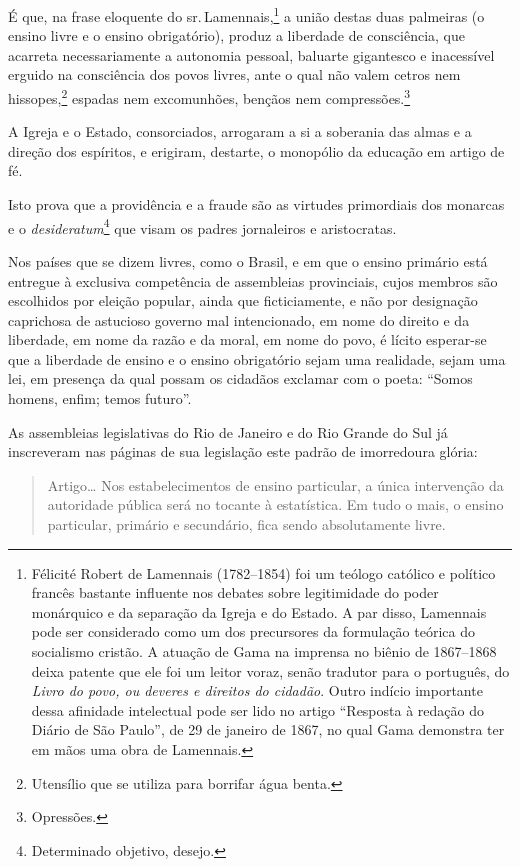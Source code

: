 É que, na frase eloquente do sr.\,Lamennais,\footnote{Félicité Robert de
  Lamennais (1782--1854) foi um teólogo católico e político francês
  bastante influente nos debates sobre legitimidade do poder monárquico
  e da separação da Igreja e do Estado. A par disso, Lamennais pode ser
  considerado como um dos precursores da formulação teórica do
  socialismo cristão. A atuação de Gama na imprensa no biênio de
  1867--1868 deixa patente que ele foi um leitor voraz, senão tradutor
  para o português, do \emph{Livro do povo, ou deveres e direitos do
  cidadão}. Outro indício importante dessa afinidade intelectual pode
  ser lido no artigo ``Resposta à redação do Diário de São Paulo'', de
  29 de janeiro de 1867, no qual Gama demonstra ter em mãos uma obra de Lamennais.}
a união destas duas palmeiras (o ensino livre e o ensino obrigatório),
produz a liberdade de consciência, que acarreta necessariamente a
autonomia pessoal, baluarte gigantesco e inacessível erguido na
consciência dos povos livres, ante o qual não valem cetros nem
hissopes,\footnote{Utensílio que se utiliza para borrifar água benta.}
espadas nem excomunhões, bençãos nem compressões.\footnote{Opressões.}

A Igreja e o Estado, consorciados, arrogaram a si a soberania das almas
e a direção dos espíritos, e erigiram, destarte, o monopólio da educação
em artigo de fé.

Isto prova que a providência e a fraude são as virtudes primordiais dos
monarcas e o \textit{desideratum}\footnote{Determinado objetivo, desejo.} que
visam os padres jornaleiros e aristocratas.

Nos países que se dizem livres, como o Brasil, e em que o ensino
primário está entregue à exclusiva competência de assembleias
provinciais, cujos membros são escolhidos por eleição popular, ainda que
ficticiamente, e não por designação caprichosa de astucioso governo mal
intencionado, em nome do direito e da liberdade, em nome da razão e da
moral, em nome do povo, é lícito esperar-se que a liberdade de ensino e
o ensino obrigatório sejam uma realidade, sejam uma lei, em presença da
qual possam os cidadãos exclamar com o poeta: ``Somos homens, enfim;
temos futuro''.

As assembleias legislativas do Rio de Janeiro e do Rio Grande do Sul já
inscreveram nas páginas de sua legislação este padrão de imorredoura
glória:

\begin{quote}
Artigo\ldots{} Nos estabelecimentos de ensino particular, a única
intervenção da autoridade pública será no tocante à estatística. Em tudo
o mais, o ensino particular, primário e secundário, fica sendo
absolutamente livre.
\end{quote}

